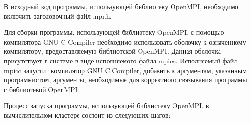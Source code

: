 
В исходный код программы, использующей библиотеку OpenMPI, необходимо включить заголовочный файл mpi.h.

Для сборки программы, использующей библиотеку OpenMPI, с помощью компилятора GNU C Compiler необходимо использовать оболочку к означенному компилятору, предоставляемую библиотекой OpenMPI. Данная оболочка присутствует в системе в виде исполняемого файла mpicc. Исполняемый файл mpicc запустит компилятор GNU C Compiler, добавить к аргументам, указанным программистом, аргументы, необходимые для корректного связывания программы с библиотекой OpenMPI.

Процесс запуска программы, использующей библиотеку OpenMPI, в вычислительном кластере состоит из следующих шагов:

